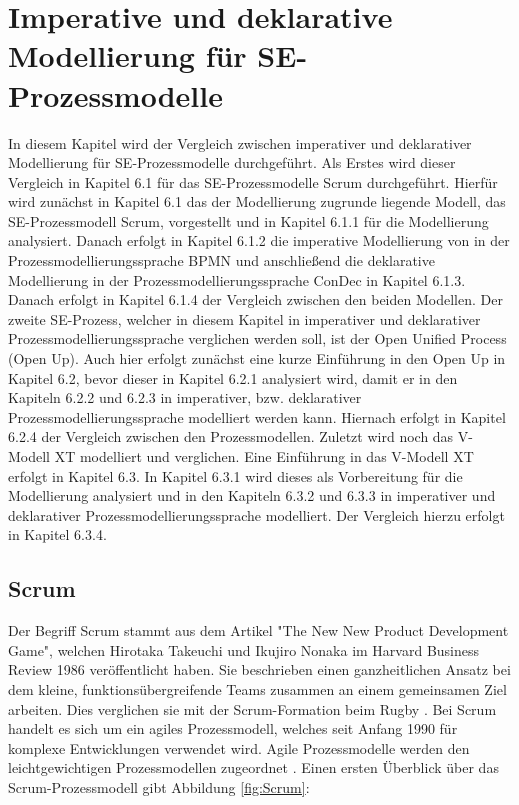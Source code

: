 \chapter{Imperative und deklarative Modellierung für SE-Prozessmodelle}\label{sec:chapter6}
In diesem Kapitel wird der Vergleich zwischen imperativer und deklarativer Modellierung für SE-Prozessmodelle durchgeführt. Als Erstes wird dieser Vergleich in Kapitel 6.1 für das SE-Prozessmodelle Scrum durchgeführt. Hierfür wird zunächst in Kapitel 6.1 das der Modellierung zugrunde liegende Modell, das SE-Prozessmodell Scrum, vorgestellt und in Kapitel 6.1.1 für die Modellierung analysiert. Danach erfolgt in Kapitel 6.1.2 die imperative Modellierung von in der Prozessmodellierungssprache BPMN und anschließend die deklarative Modellierung in der Prozessmodellierungssprache ConDec in Kapitel 6.1.3. Danach erfolgt  in Kapitel 6.1.4 der Vergleich zwischen den beiden Modellen.\newline
Der zweite SE-Prozess, welcher in diesem Kapitel in imperativer und deklarativer Prozessmodellierungssprache verglichen werden soll, ist der Open Unified Process (Open Up). Auch hier erfolgt zunächst eine kurze Einführung in den Open Up in Kapitel 6.2, bevor dieser in Kapitel 6.2.1 analysiert wird, damit er in den Kapiteln 6.2.2 und 6.2.3 in imperativer, bzw. deklarativer Prozessmodellierungssprache modelliert werden kann. Hiernach erfolgt in Kapitel 6.2.4 der Vergleich zwischen den Prozessmodellen.\newline
Zuletzt wird noch das V-Modell XT modelliert und verglichen. Eine Einführung in das V-Modell XT erfolgt in Kapitel 6.3. In Kapitel 6.3.1 wird dieses als Vorbereitung für die Modellierung analysiert und in den Kapiteln 6.3.2 und 6.3.3 in imperativer und deklarativer Prozessmodellierungssprache modelliert. Der Vergleich hierzu erfolgt in Kapitel 6.3.4.


\section{Scrum}\label{sec:chapter6:Imperative Modellierung}

Der Begriff Scrum stammt aus dem Artikel "The New New Product Development Game", welchen Hirotaka Takeuchi und Ikujiro Nonaka im Harvard Business Review 1986 veröffentlicht haben. Sie beschrieben einen ganzheitlichen Ansatz bei dem kleine, funktionsübergreifende Teams zusammen an einem gemeinsamen Ziel arbeiten. Dies verglichen sie mit der Scrum-Formation beim Rugby \cite{Pham2012,Takeuchi1986}. \newline
Bei Scrum handelt es sich um ein agiles Prozessmodell, welches seit Anfang 1990 für komplexe Entwicklungen verwendet wird. Agile Prozessmodelle werden den leichtgewichtigen Prozessmodellen zugeordnet \cite{Hanser2010, Lacey2012}. Einen ersten Überblick über das Scrum-Prozessmodell gibt Abbildung \ref{fig:Scrum}:

